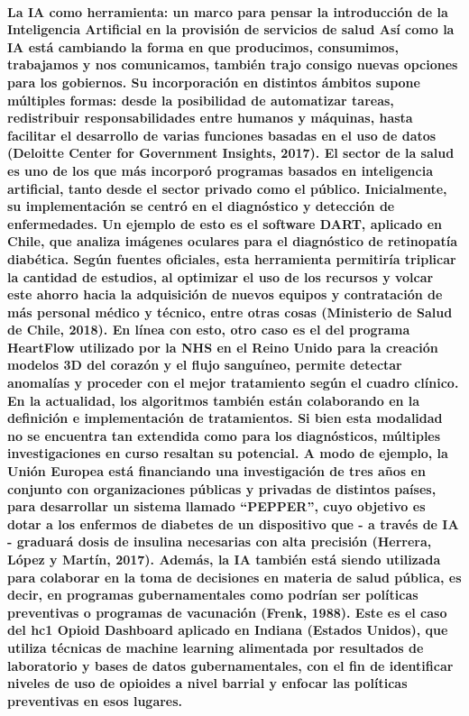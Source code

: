 \documentclass[12pt]{article}
\begin{document}
\paragraph{
La IA como herramienta: un marco para pensar la introducción de la Inteligencia Artificial en la provisión de servicios de salud
Así como la IA está cambiando la forma en que producimos, consumimos, trabajamos y nos comunicamos, también trajo consigo nuevas opciones para los gobiernos. Su incorporación en distintos ámbitos supone múltiples formas: desde la posibilidad de automatizar tareas, redistribuir responsabilidades entre humanos y máquinas, hasta facilitar el desarrollo de varias funciones basadas en el uso de datos (Deloitte Center for Government Insights, 2017).
El sector de la salud es uno de los que más incorporó programas basados en inteligencia artificial, tanto desde el sector privado como el público. Inicialmente, su implementación se centró en el diagnóstico y detección de enfermedades. Un ejemplo de esto es el software DART, aplicado en Chile, que analiza imágenes oculares para el diagnóstico de retinopatía diabética. Según fuentes oficiales, esta herramienta permitiría triplicar la cantidad de estudios, al optimizar el uso de los recursos y volcar este ahorro hacia la adquisición de nuevos equipos y contratación de más personal médico y técnico, entre otras cosas (Ministerio de Salud de Chile, 2018). En línea con esto, otro caso es el del programa HeartFlow utilizado por la NHS en el Reino Unido para la creación modelos 3D del corazón y el flujo sanguíneo, permite detectar anomalías y proceder con el mejor tratamiento según el cuadro clínico.
En la actualidad, los algoritmos también están colaborando en la definición e implementación de tratamientos. Si bien esta modalidad no se encuentra tan extendida como para los diagnósticos, múltiples investigaciones en curso resaltan su potencial. A modo de ejemplo, la Unión Europea está financiando una investigación de tres años en conjunto con organizaciones públicas y privadas de distintos países, para desarrollar un sistema llamado “PEPPER”, cuyo objetivo es dotar a los enfermos de diabetes de un dispositivo que - a través de IA - graduará dosis de insulina necesarias con alta precisión (Herrera, López y Martín, 2017).
Además, la IA también está siendo utilizada para colaborar en la toma de decisiones en materia de salud pública, es decir, en programas gubernamentales como podrían ser políticas preventivas o programas de vacunación (Frenk, 1988). Este es el caso del hc1 Opioid Dashboard aplicado en Indiana (Estados Unidos), que utiliza técnicas de machine learning alimentada por resultados de laboratorio y bases de datos gubernamentales, con el fin de identificar niveles de uso de opioides a nivel barrial y enfocar las políticas preventivas en esos lugares.
}
\end{document}
